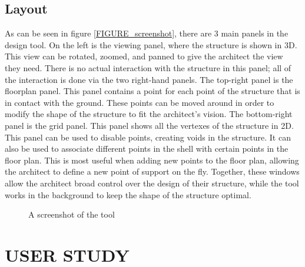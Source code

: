 \documentclass{thesis}
\begin{document}
\section{Layout}
As can be seen in figure \ref{FIGURE_screenshot}, there are 3 main panels in the design tool.  On the left is the viewing panel, where the structure
is shown in 3D.  This view can be rotated, zoomed, and panned to give the architect the view they need.  There is no actual interaction with the
structure in this panel; all of the interaction is done via the two right-hand panels.  The top-right panel is the floorplan panel.  This panel
contains a point for each point of the structure that is in contact with the ground.  These points can be moved around in order to modify the shape
of the structure to fit the architect's vision.  The bottom-right panel is the grid panel.  This panel shows all the vertexes of the structure in 2D.
This panel can be used to disable points, creating voids in the structure.  It can also be used to associate different points in the shell with certain
points in the floor plan.  This is most useful when adding new points to the floor plan, allowing the architect to define a new point of support on the
fly.  Together, these windows allow the architect broad control over the design of their structure, while the tool works in the background to keep the
shape of the structure optimal.
\begin{figure}
\caption{A screenshot of the tool}
\label{fig:screenshot}
\end{figure}


\chapter{USER STUDY}
\end{document}

